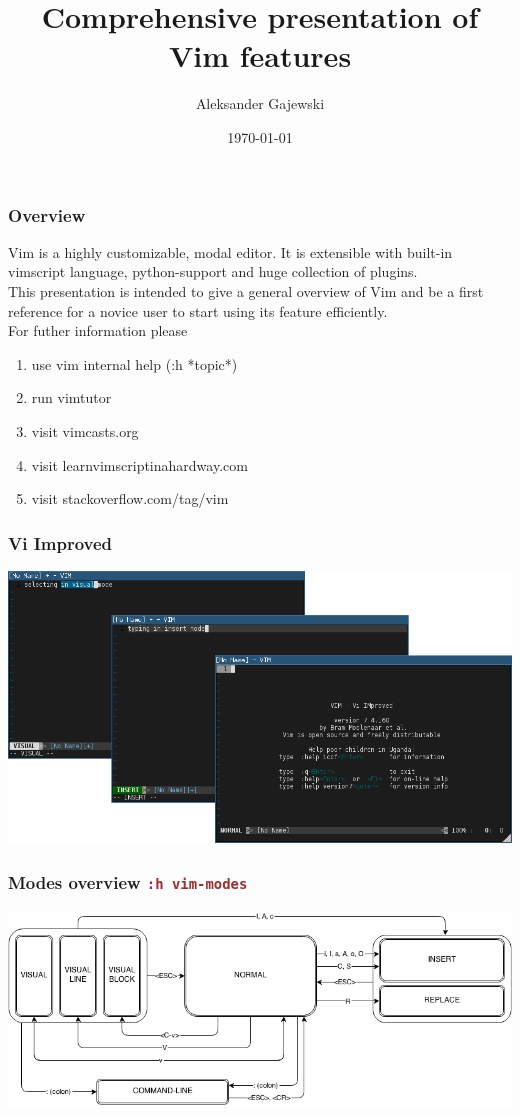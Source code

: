 \documentclass{beamer}
\title[Vim Intro]{Comprehensive presentation of Vim features} %
\author{Aleksander Gajewski} %
\institute[None] %
{
\textit{adiog@brainfuck.pl} %
}
\date{\today} %
\newcommand{\vimcommand}[1]{\texttt{\textcolor{brown}{#1}}}
\newcommand{\vimhelp}[1]{\vimcommand{:h #1}}
\begin{document}
\begin{frame}
\titlepage %
\end{frame}

\begin{frame}
    \frametitle{Overview}
    Vim is a highly customizable, modal editor. It is extensible with built-in vimscript language, python-support and huge collection of plugins.\\
    This presentation is intended to give a general overview of Vim and be a first reference for a novice user to start using its feature efficiently.\\
    For futher information please
    \begin{enumerate} 
        \item use vim internal help (:h \textrm{*topic*})
        \item run vimtutor
        \item visit vimcasts.org
        \item visit learnvimscriptinahardway.com
        \item visit stackoverflow.com/tag/vim
    \end{enumerate}
\end{frame}

\begin{frame}[fragile]
    \frametitle{Vi Improved}
    \includegraphics[width=\textwidth]{vim_screen.png}
\end{frame}

\begin{frame}[fragile]
    \frametitle{Modes overview \vimhelp{vim-modes}}
    \includegraphics[width=\textwidth]{vim_modes.png}
\end{frame}
\end{document}
